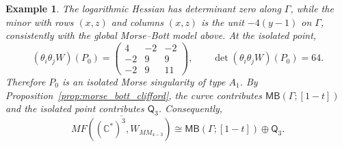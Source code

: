 \documentclass[11pt]{amsart}
\newtheorem{example}{Example}[section]
\newcommand{\MorseCat}[1]{\mathsf{Q}_{#1}}
\newcommand{\MBtwcat}[2]{\mathsf{MB}(#1;[#2])}
\begin{document}
\begin{example}
The logarithmic Hessian has determinant zero along $\Gamma$, while the minor
with rows $(x,z)$ and columns $(x,z)$ is the unit $-4(y-1)$ on $\Gamma$,
consistently with the global Morse--Bott model above. At the isolated point,
\[
(\theta_i\theta_jW)(P_0)=
\begin{pmatrix}
4 & -2 & -2 \\
-2 & 9 & 9 \\
-2 & 9 & 11
\end{pmatrix},
\qquad
\det(\theta_i\theta_jW)(P_0)=64.
\]
Therefore $P_0$ is an isolated Morse singularity of type $A_1$. By
Proposition~\ref{prop:morse_bott_clifford}, the curve contributes
$\MBtwcat{\Gamma}{1-t}$ and the isolated point contributes $\MorseCat{3}$.
Consequently,
\[
\overline{MF((\mathbb{C}^*)^3,W_{MM_{4-3}})}
\cong \MBtwcat{\Gamma}{1-t}\oplus \MorseCat{3}.
\]
\end{example}
\end{document}
